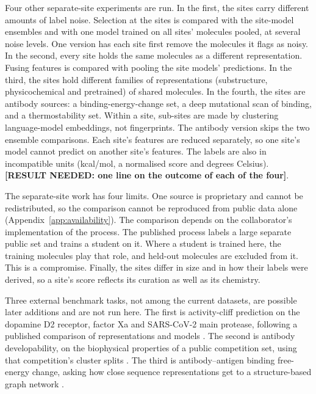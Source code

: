 Four other separate-site experiments are run. In the first, the sites carry different amounts of label noise. Selection at the sites is compared with the site-model ensembles and with one model trained on all sites' molecules pooled, at several noise levels. One version has each site first remove the molecules it flags as noisy. In the second, every site holds the same molecules as a different representation. Fusing features is compared with pooling the site models' predictions. In the third, the sites hold different families of representations (substructure, physicochemical and pretrained) of shared molecules. In the fourth, the sites are antibody sources: a binding-energy-change set, a deep mutational scan of binding, and a thermostability set. Within a site, sub-sites are made by clustering language-model embeddings, not fingerprints. The antibody version skips the two ensemble comparisons. Each site's features are reduced separately, so one site's model cannot predict on another site's features. The labels are also in incompatible units (kcal/mol, a normalised score and degrees Celsius). \textbf{[RESULT NEEDED: one line on the outcome of each of the four]}.

The separate-site work has four limits. One source is proprietary and cannot be redistributed, so the comparison cannot be reproduced from public data alone (Appendix~\ref{app:availability}). The comparison depends on the collaborator's implementation of the process. The published process labels a large separate public set and trains a student on it. Where a student is trained here, the training molecules play that role, and held-out molecules are excluded from it. This is a compromise. Finally, the sites differ in size and in how their labels were derived, so a site's score reflects its curation as well as its chemistry.

Three external benchmark tasks, not among the current datasets, are possible later additions and are not run here. The first is activity-cliff prediction on the dopamine D2 receptor, factor Xa and SARS-CoV-2 main protease, following a published comparison of representations and models \citep{Dablander2023}. The second is antibody developability, on the biophysical properties of a public competition set, using that competition's cluster splits \citep{vanNiekerk2026}. The third is antibody--antigen binding free-energy change, asking how close sequence representations get to a structure-based graph network \citep{Hummer2025}.


